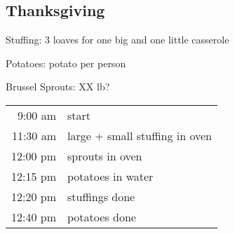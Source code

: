 
\subsection{Thanksgiving}

Stuffing: 3 loaves for one big and one little casserole

Potatoes: \half potato per person

Brussel Sprouts: XX lb?

\begin{tabular}{rl}
   9:00 am & start\\
  11:30 am & large + small stuffing in oven\\
  12:00 pm & sprouts in oven\\
  12:15 pm & potatoes in water\\
  12:20 pm & stuffings done\\
  12:40 pm & potatoes done
\end{tabular}


